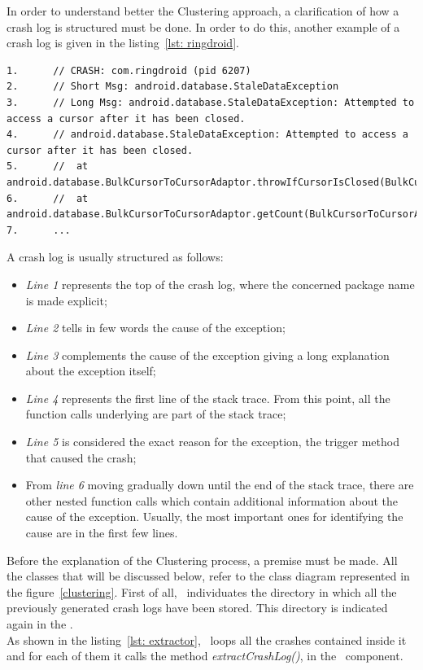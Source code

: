 In order to understand better the Clustering approach, a clarification of how a crash log is structured must be done. In order to do this, another example of a crash log is given in the listing~\ref{lst: ringdroid}. 
\begin{lstlisting}[caption=Structure of a crash log, basicstyle=\fontsize{6}{8}\ttfamily,label={lst: ringdroid}]
1.		// CRASH: com.ringdroid (pid 6207)
2.		// Short Msg: android.database.StaleDataException
3.		// Long Msg: android.database.StaleDataException: Attempted to access a cursor after it has been closed.
4.		// android.database.StaleDataException: Attempted to access a cursor after it has been closed.
5.		// 	at android.database.BulkCursorToCursorAdaptor.throwIfCursorIsClosed(BulkCursorToCursorAdaptor.java:64)
6. 		// 	at android.database.BulkCursorToCursorAdaptor.getCount(BulkCursorToCursorAdaptor.java:70)
7.		...
\end{lstlisting}
A crash log is usually structured as follows: 
\begin{itemize}
\item \textit{Line 1} represents the top of the crash log, where the concerned package name is made explicit;
\item \textit{Line 2} tells in few words the cause of the exception; 
\item \textit{Line 3} complements the cause of the exception giving a long explanation about the exception itself;
\item \textit{Line 4} represents the first line of the stack trace. From this point, all the function calls underlying are part of the stack trace;
\item \textit{Line 5} is considered the exact reason for the exception, \ie the trigger method that caused the crash;
\item From \textit{line 6} moving gradually down until the end of the stack trace, there are other nested function calls which contain additional information about the cause of the exception. Usually, the most important ones for identifying the cause are in the first few lines. 
\end{itemize}
Before the explanation of the Clustering process, a premise must be made. All the classes that will be discussed below, refer to the class diagram represented in the figure~\ref{clustering}. 
First of all, \toolname\ individuates the directory in which all the previously generated crash logs have been stored. This directory is indicated again in the \Config.\\  
As shown in the listing~\ref{lst: extractor}, \toolname\ loops all the crashes contained inside it and for each of them it calls the method \textit{extractCrashLog()}, in the \Extractor\ component. 

